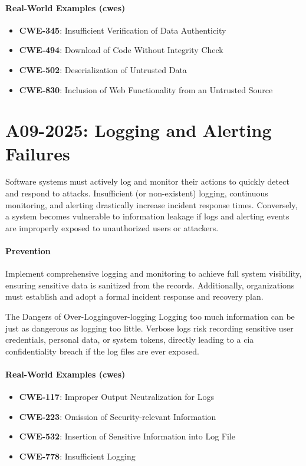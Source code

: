 \paragraph{Real-World Examples (\glspl{cwe})}
\begin{itemize}
    \item \textbf{CWE-345}: Insufficient Verification of Data Authenticity
    \item \textbf{CWE-494}: Download of Code Without Integrity Check
    \item \textbf{CWE-502}: Deserialization of Untrusted Data
    \item \textbf{CWE-830}: Inclusion of Web Functionality from an Untrusted Source
\end{itemize}


\section{A09-2025: Logging and Alerting Failures} 
Software systems must actively log and monitor their actions to quickly detect and respond to attacks. Insufficient (or non-existent) logging, continuous monitoring, and alerting drastically increase incident response times. Conversely, a system becomes vulnerable to information leakage if logs and alerting events are improperly exposed to unauthorized users or attackers.

\paragraph{Prevention} Implement comprehensive logging and monitoring to achieve full system visibility, ensuring sensitive data is sanitized from the records. Additionally, organizations must establish and adopt a formal incident response and recovery plan.

\begin{observation}{The Dangers of Over-Logging}{over-logging}
    Logging too much information can be just as dangerous as logging too little. Verbose logs risk recording sensitive user credentials, personal data, or system tokens, directly leading to a \gls{cia} confidentiality breach if the log files are ever exposed.
\end{observation}

\paragraph{Real-World Examples (\glspl{cwe})}
\begin{itemize}
    \item \textbf{CWE-117}: Improper Output Neutralization for Logs
    \item \textbf{CWE-223}: Omission of Security-relevant Information
    \item \textbf{CWE-532}: Insertion of Sensitive Information into Log File
    \item \textbf{CWE-778}: Insufficient Logging
\end{itemize}


